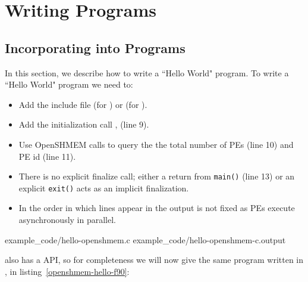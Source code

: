 \clearpage

\appendix

\pagestyle{fancy} \withlinenumbers
\fancyhf{}
\fancyhead[RE, LO]{\leftmark}
\fancyhead[RO, LE]{\thepage}
\fancyfoot[CE,CO]{\thepage}
\renewcommand{\headrulewidth}{0pt}




\chapter{Writing \openshmem Programs}
\section*{Incorporating \openshmem{} into Programs}\label{sec:writing_programs}

In this section, we describe how to write a ``Hello World" \openshmem program.
To write a ``Hello World" \openshmem program we need to: 

\begin{itemize}
\item Add the include file  (for \Cstd) or  (for \Fortran).
\item Add the initialization call , (line 9).
\item Use OpenSHMEM calls to query the the total number of PEs (line 10) and PE
    id (line 11).
\item There is no explicit finalize call; either a return from \texttt{main()}
    (line 13) or an explicit \texttt{exit()} acts as an implicit \openshmem
    finalization.
\item In \openshmem the order in which lines appear in the output is not fixed
    as \acp{PE} execute asynchronously in parallel.
\end{itemize}

\begin{minipage}{\linewidth}
\vspace{0.1in}
                {example_code/hello-openshmem.c}
                {example_code/hello-openshmem-c.output}
\vspace{0.1in}
\end{minipage}

\openshmem also has a \Fortran API, so for completeness we will now give the
same program written in \Fortran, in listing~\ref{openshmem-hello-f90}:

